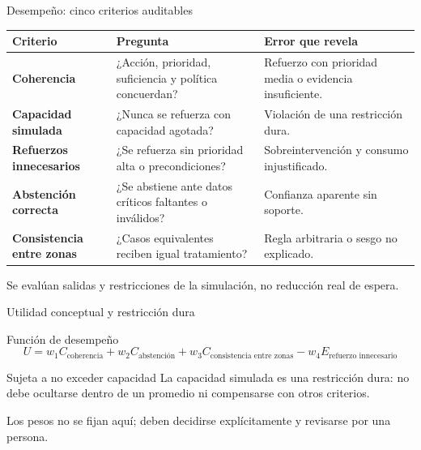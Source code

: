 \documentclass[aspectratio=169,11pt]{beamer}
\begin{document}
\begin{frame}{Desempeño: cinco criterios auditables}
  \scriptsize
  \begin{tabularx}{\textwidth}{>{\bfseries}p{}X p{}}
    \toprule
    Criterio & Pregunta & Error que revela \\\midrule
    Coherencia & ¿Acción, prioridad, suficiencia y política concuerdan? & Refuerzo con prioridad media o evidencia insuficiente. \\
    Capacidad simulada & ¿Nunca se refuerza con capacidad agotada? & Violación de una restricción dura. \\
    Refuerzos innecesarios & ¿Se refuerza sin prioridad alta o precondiciones? & Sobreintervención y consumo injustificado. \\
    Abstención correcta & ¿Se abstiene ante datos críticos faltantes o inválidos? & Confianza aparente sin soporte. \\
    Consistencia entre zonas & ¿Casos equivalentes reciben igual tratamiento? & Regla arbitraria o sesgo no explicado. \\
    \bottomrule
  \end{tabularx}
  \vfill
  \alert{Se evalúan salidas y restricciones de la simulación, no reducción real de espera.}
\end{frame}

\begin{frame}{Utilidad conceptual y restricción dura}
  \begin{block}{Función de desempeño}
    \[
      U = w_1 C_{\text{coherencia}} + w_2 C_{\text{abstención}} + w_3 C_{\text{consistencia entre zonas}} - w_4 E_{\text{refuerzo innecesario}}
    \]
  \end{block}
  \begin{alertblock}{Sujeta a no exceder capacidad}
    La capacidad simulada es una restricción dura: no debe ocultarse dentro de un promedio ni compensarse con otros criterios.
  \end{alertblock}
  Los pesos no se fijan aquí; deben decidirse explícitamente y revisarse por una persona.
\end{frame}
\end{document}
